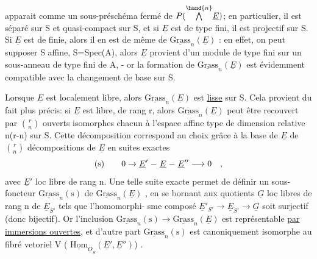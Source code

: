 
apparait comme un sous-préschéma fermé de $P(\overset{\hand{n}}{\bigwedge}\underline{E})$; en particulier, il
est séparé sur S et quasi-compact sur S, et  si $\underline{E}$  est de type fini,
il est projectif sur S. Si $\underline{E}$ est de  finie, alors
il en est de même de $\underline{\text{Grass}}_n(\underline{E})$ : en effet,  on peut
supposer S affine, S=Spec(A), alors $\underline{E}$ provient d'un module de type fini
sur un sous-anneau de type fini de A, -  or la formation de $\underline{\text{Grass}}_n(\underline{E})$
est évidemment compatible avec la changement de base sur S.

Lorsque $\underline{E}$  est localement libre, alors  $\underline{\text{Grass}}_n(\underline{E})$
est \uline{lisse} sur S. Cela provient du fait plus précis: si $\underline{E}$ est libre,
de rang r, alors  $\underline{\text{Grass}}_n(\underline{E})$  peut être recouvert par  $\binom{r}{n}$  ouverts
isomorphes chacun  à  l'espace affine type de dimension relative
n(r-n)  sur S.  Cette décomposition correspond au choix grâce à la base
de $\underline{E}$  de  $\binom{r}{n}$  décompositions de $\underline{E}$  en  suites
exactes
\[
\text{(s)} \qquad 0 \rightarrow \underline{E}' \relbar \underline{E} \relbar \underline{E}'' \longrightarrow 0 \quad ,
\]
avec $\underline{E}'$  loc libre de rang n.  Une telle suite exacte permet
de définir un sous-foncteur  $\underline{\text{Grass}}_n(\text{s})$  de  $\underline{\text{Grass}}_n(\underline{E})$ , en se bornant
aux  quotients  $\underline{G}$  loc libres de rang  n de  $\underline{E}_{S'}$  tels que l'homomorphi-%
sme composé  $\underline{E}'_{S'} \longrightarrow \underline{E}_{S'} \longrightarrow \underline{G}$  soit surjectif (donc bijectif). Or
l'inclusion  $\underline{\text{Grass}}_n(\text{s}) \rightarrow \underline{\text{Grass}}_n(\underline{E})$  est représentable \uline{par immersions
ouvertes}, et d'autre part  $\underline{\text{Grass}}_n(\text{s})$  est canoniquement isomorphe
au fibré vetoriel    V ( $\underline{\text{Hom}}_{\underline{O}_S}(\underline{E}',\underline{E}'')$) .

